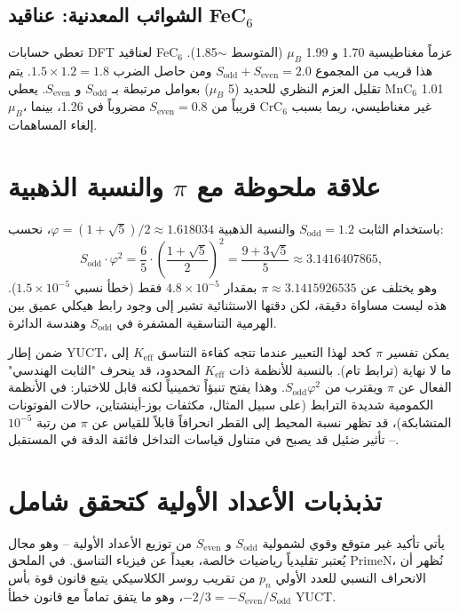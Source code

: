 \documentclass[11pt,a4paper]{article}
\begin{document}
	\subsection{الشوائب المعدنية: عناقيد FeC\({}_6\)}
	تعطي حسابات DFT لعناقيد FeC\({}_6\) عزماً مغناطيسية 1.70 و 1.99 \(\mu_B\) (المتوسط \(\sim\)1.85). هذا قريب من المجموع \(S_{\text{odd}}+S_{\text{even}}=2.0\) ومن حاصل الضرب \(1.5\times1.2=1.8\). يتم تقليل العزم النظري للحديد (5 \(\mu_B\)) بعوامل مرتبطة بـ \(S_{\text{odd}}\) و \(S_{\text{even}}\). يعطي MnC\({}_6\) 1.01 \(\mu_B\)، قريباً من \(S_{\text{even}}=0.8\) مضروباً في 1.26، بينما CrC\({}_6\) غير مغناطيسي، ربما بسبب إلغاء المساهمات.
	
	\section{علاقة ملحوظة مع \(\pi\) والنسبة الذهبية}
	\label{sec:pi_relation}
	
	باستخدام الثابت \(S_{\text{odd}} = 1.2\) والنسبة الذهبية \(\varphi = (1+\sqrt{5})/2 \approx 1.618034\)، نحسب:
	\[
	S_{\text{odd}} \cdot \varphi^2 = \frac{6}{5} \cdot \left(\frac{1+\sqrt{5}}{2}\right)^2 = \frac{9+3\sqrt{5}}{5} \approx 3.1416407865,
	\]
	وهو يختلف عن \(\pi \approx 3.1415926535\) بمقدار \(4.8\times10^{-5}\) فقط (خطأ نسبي \(1.5\times10^{-5}\)). هذه ليست مساواة دقيقة، لكن دقتها الاستثنائية تشير إلى وجود رابط هيكلي عميق بين الهرمية التناسقية المشفرة في \(S_{\text{odd}}\) وهندسة الدائرة.
	
	ضمن إطار YUCT، يمكن تفسير \(\pi\) كحد لهذا التعبير عندما تتجه كفاءة التناسق \(K_{\text{eff}}\) إلى ما لا نهاية (ترابط تام). بالنسبة للأنظمة ذات \(K_{\text{eff}}\) المحدود، قد ينحرف "الثابت الهندسي" الفعال عن \(\pi\) ويقترب من \(S_{\text{odd}}\varphi^2\). وهذا يفتح تنبؤاً تخمينياً لكنه قابل للاختبار: في الأنظمة الكمومية شديدة الترابط (على سبيل المثال، مكثفات بوز-أينشتاين، حالات الفوتونات المتشابكة)، قد تظهر نسبة المحيط إلى القطر انحرافاً قابلاً للقياس عن \(\pi\) من رتبة \(10^{-5}\) -- تأثير ضئيل قد يصبح في متناول قياسات التداخل فائقة الدقة في المستقبل.
	
	\section{تذبذبات الأعداد الأولية كتحقق شامل}
	\label{sec:primes}
	
	يأتي تأكيد غير متوقع وقوي لشمولية \(S_{\mathrm{odd}}\) و \(S_{\mathrm{even}}\) من توزيع الأعداد الأولية -- وهو مجال يُعتبر تقليدياً رياضيات خالصة، بعيداً عن فيزياء التناسق. في الملحق PrimeN، نُظهر أن الانحراف النسبي للعدد الأولي \(p_n\) من تقريب روسر الكلاسيكي يتبع قانون قوة بأس \(-2/3 = -S_{\mathrm{even}}/S_{\mathrm{odd}}\)، وهو ما يتفق تماماً مع قانون خطأ YUCT.
	
\end{document}
